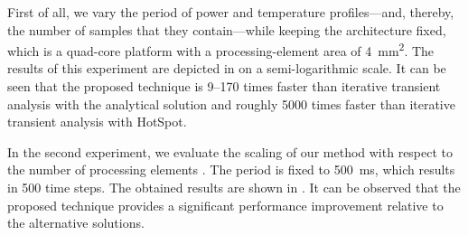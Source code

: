 First of all, we vary the period \period of power and temperature
profiles---and, thereby, the number of samples \ns that they contain---while
keeping the architecture fixed, which is a quad-core platform with a
processing-element area of 4~mm\textsuperscript{2}. The results of this
experiment are depicted in  on a
semi-logarithmic scale. It can be seen that the proposed technique is 9--170
times faster than iterative transient analysis with the analytical solution and
roughly 5000 times faster than iterative transient analysis with HotSpot.

In the second experiment, we evaluate the scaling of our method with respect to
the number of processing elements \np. The period is fixed to 500~ms, which
results in 500 time steps. The obtained results are shown in
. It can be observed that the
proposed technique provides a significant performance improvement relative to
the alternative solutions.
